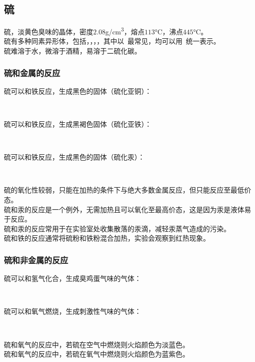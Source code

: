 \documentclass[UTF8]{ctexart}
\begin{document}
\subsection{硫}
    硫，淡黄色臭味的晶体，密度$2.08$\si{g/cm^3}，熔点$113$\si{\degreeCelsius}，沸点$445$\si{\degreeCelsius}。\\[3mm]
    硫有多种同素异形体，包括，，，，其中以~最常见，均可以用~统一表示。\\[3mm]
    硫难溶于水，微溶于酒精，易溶于二硫化碳。

\subsubsection{硫和金属的反应}
    硫可以和铁反应，生成黑色的固体（硫化亚铜）：
    \begin{center}
        \\[6mm]
    \end{center}
    硫可以和铁反应，生成黑褐色固体（硫化亚铁）：
    \begin{center}
        \\[6mm]
    \end{center}
    硫可以和铁反应，生成黑色的固体（硫化汞）：
    \begin{center}
        \\[6mm]
    \end{center}
    硫的氧化性较弱，只能在加热的条件下与绝大多数金属反应，但只能反应至最低价态。\\[3mm]
    硫和汞的反应是一个例外，无需加热且可以氧化至最高价态，这是因为汞是液体易于反应。\\[3mm]
    硫和汞的反应常用于在实验室处收集散落的汞滴，减轻汞蒸气造成的污染。\\[3mm]
    硫和铁的反应通常将硫粉和铁粉混合加热，实验会观察到红热现象。

\subsubsection{硫和非金属的反应}
    硫可以和氢气化合，生成臭鸡蛋气味的气体：
    \begin{center}
        \\[6mm]
    \end{center}
    硫可以和氧气燃烧，生成刺激性气味的气体：
    \begin{center}
        \\[6mm]
    \end{center}
    硫和氧气的反应中，若硫在空气中燃烧则火焰颜色为淡蓝色。\\[3mm]
    硫和氧气的反应中，若硫在氧气中燃烧则火焰颜色为蓝紫色。
\end{document}
